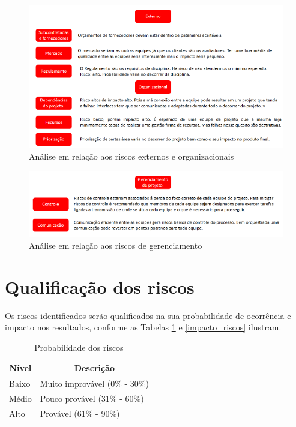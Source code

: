 \begin{apendicesenv}
  \begin{figure}[h]
    \begin{center}
    \includegraphics[scale=0.65]{figuras/riscos_externos_organizacional.png}
    \end{center}
    \label{riscos_externos}
    \caption{Análise em relação aos riscos externos e organizacionais}
  \end{figure}
  
  \begin{figure}[ht]
    \begin{center}
    \includegraphics[scale=0.65]{figuras/riscos_gerenciamento.png}
    \end{center}
    \label{riscos_gerenciamento}
    \caption{Análise em relação aos riscos de gerenciamento}
  \end{figure}

\vfill
\pagebreak

\section*{Qualificação dos riscos}
Os riscos identificados serão qualificados na sua probabilidade de ocorrência e impacto nos resultados, conforme as Tabelas \ref{probabilidade_riscos} e \ref{impacto_riscos} ilustram.

\begin{table}[h]
\centering
\caption{Probabilidade dos riscos}
\label{probabilidade_riscos}
\begin{tabular}{|l|l|}
\hline
\multicolumn{1}{|c|}{\textbf{Nível}} & \multicolumn{1}{c|}{\textbf{Descrição}} \\ \hline
Baixo                                & Muito improvável (0\% - 30\%)       \\ \hline
Médio                                & Pouco provável (31\% - 60\%)            \\ \hline
Alto                                 & Provável (61\% - 90\%)                  \\ \hline
\end{tabular}
\end{table}



\end{apendicesenv}
